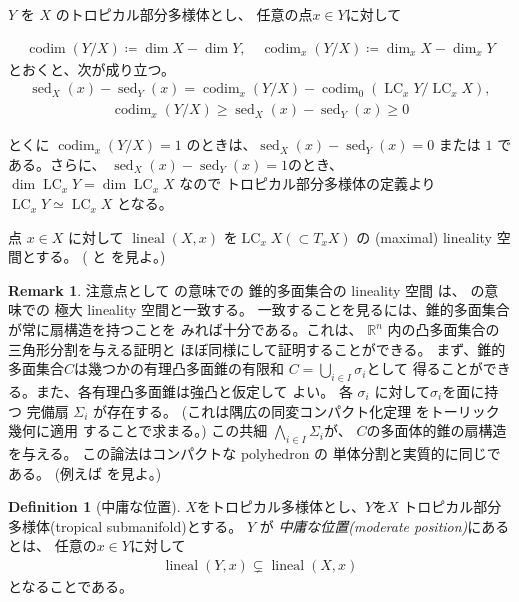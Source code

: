 \documentclass[a4paper,dvipdfmx,reqno,12pt]{amsart}
\theoremstyle{definition}
\newtheorem{definition}[theorem]{Definition}
\newtheorem{remark}[theorem]{Remark}
\newcommand{\deq}{\coloneqq}
\newcommand{\opn}[1]{\operatorname{#1}}
\numberwithin{equation}{section}
\begin{document}
$Y$ を $X$ 
のトロピカル部分多様体とし、
任意の点$x\in Y$に対して

\begin{align}
\opn{codim}(Y/X)\deq \dim X -\dim Y,\quad 
\opn{codim}_x(Y/X)\deq \dim_x X -\dim_x Y
\end{align}
とおくと、次が成り立つ。
\begin{align}
\opn{sed}_X(x)-\opn{sed}_Y(x)=
\opn{codim}_x(Y/X)-\opn{codim}_0(\opn{LC}_x Y/\opn{LC}_xX),
\end{align}
\begin{align}
\opn{codim}_x(Y/X) \geq 
\opn{sed}_X(x)-\opn{sed}_Y(x)\geq 0
\end{align}

とくに $\opn{codim}_x(Y/X)=1$
のときは、$\opn{sed}_X(x)-\opn{sed}_Y(x)=0$ または
$1$ である。さらに、
$\opn{sed}_X(x)-\opn{sed}_Y(x)=1$のとき、
$\dim \opn{LC}_x Y=\dim \opn{LC}_x X$
なので トロピカル部分多様体の定義より
$\opn{LC}_x Y\simeq \opn{LC}_x X$
となる。

点 $x\in X$ に対して
$\opn{lineal}(X,x)$ を$\opn{LC}_x X (\subset T_x X)$
の (maximal) lineality 空間とする。
(\cite[]{MR4246795} と
\cite[]{demedrano2023chern} を見よ。)



\begin{remark}
注意点として
\cite[]{MR3041763}の意味での
錐的多面集合の lineality 空間
は、
\cite[]{MR4246795}の意味での
極大 lineality 空間と一致する。
一致することを見るには、錐的多面集合が常に扇構造を持つことを
みれば十分である。これは、
$\mathbb{R}^{n}$ 内の凸多面集合の三角形分割を与える証明と
ほぼ同様にして証明することができる。
まず、錐的多面集合$C$は幾つかの有理凸多面錐の有限和
$C=\bigcup_{i\in I}\sigma_i$として
得ることができる。また、各有理凸多面錐は強凸と仮定して
よい。
各 $\sigma_i$ に対して$\sigma_i$を面に持つ
完備扇 $\Sigma_i$ が存在する。
(これは隅広の同変コンパクト化定理
\cite[Theorem 3]{MR337963}をトーリック幾何に適用
することで求まる。)
この共細 $\bigwedge_{i\in I}\Sigma_i$が、
$C$の多面体的錐の扇構造を与える。
この論法はコンパクトな polyhedron の
単体分割と実質的に同じである。
(例えば\cite[Theorem 2.11]{MR665919}
を見よ。)
\end{remark}

\begin{definition}[{中庸な位置}]
\label{definition-permissible-position}
$X$をトロピカル多様体とし、$Y$を$X$
トロピカル部分多様体(tropical submanifold)とする。
$Y$ が \emph{中庸な位置(moderate position)}にあるとは、
任意の$x\in Y$に対して
\begin{align}
     \opn{lineal}(Y,x) \subsetneq
 \opn{lineal}(X,x)
\end{align}
となることである。
\end{definition}
\end{document}
